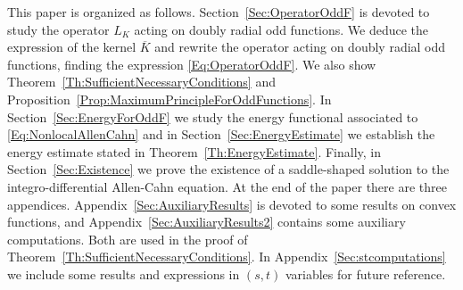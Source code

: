 This paper is organized as follows. Section~\ref{Sec:OperatorOddF} is devoted to study the operator $L_K$ acting on doubly radial odd functions. We deduce the expression of the kernel $\overline{K}$ and rewrite the operator acting on doubly radial odd functions, finding the expression \eqref{Eq:OperatorOddF}. We also show Theorem~\ref{Th:SufficientNecessaryConditions} and Proposition~\ref{Prop:MaximumPrincipleForOddFunctions}. In Section~\ref{Sec:EnergyForOddF} we study the energy functional associated to \eqref{Eq:NonlocalAllenCahn} and in Section~\ref{Sec:EnergyEstimate} we establish the energy estimate stated in Theorem~\ref{Th:EnergyEstimate}. Finally, in Section~\ref{Sec:Existence} we prove the existence of a saddle-shaped solution to the integro-differential Allen-Cahn equation. At the end of the paper there are three appendices. Appendix~\ref{Sec:AuxiliaryResults} is devoted to some results on convex functions, and Appendix~\ref{Sec:AuxiliaryResults2} contains some auxiliary computations. Both are used in the proof of Theorem~\ref{Th:SufficientNecessaryConditions}. In Appendix~\ref{Sec:stcomputations} we include some results and expressions in $(s,t)$ variables for future reference.